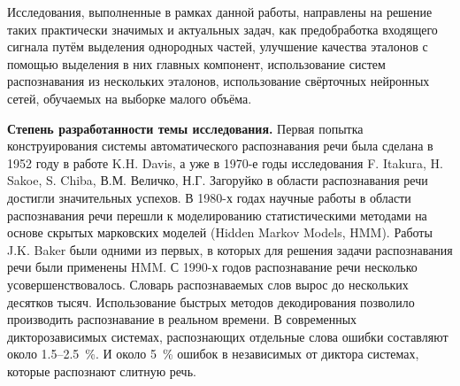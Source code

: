 Исследования, выполненные в рамках данной работы, направлены на решение таких практически значимых и актуальных задач, как предобработка входящего сигнала путём выделения однородных частей, улучшение качества эталонов с помощью выделения в них главных компонент, использование систем распознавания из нескольких эталонов, использование свёрточных нейронных сетей, обучаемых на выборке малого объёма.

\textbf{Степень разработанности темы исследования.}
Первая попытка конструирования системы автоматического распознавания речи была сделана в 1952 году в работе K.H. Davis, а уже в 1970-е годы исследования F. Itakura, H. Sakoe, S. Chiba, В.М. Величко, Н.Г. Загоруйко в области распознавания речи достигли значительных успехов.
В 1980-х годах научные работы в области распознавания речи перешли к моделированию статистическими методами на основе скрытых марковских моделей (Hidden Markov Models, HMM).
Работы J.K. Baker были одними из первых, в которых для решения задачи распознавания речи были применены HMM.
С 1990-х годов распознавание речи несколько усовершенствовалось.
Словарь распознаваемых слов вырос до нескольких десятков тысяч.
Использование быстрых методов декодирования позволило производить распознавание в реальном времени.
В современных дикторозависимых системах, распознающих отдельные слова ошибки составляют около 1.5--2.5~\%.
И около 5~\% ошибок в независимых от диктора системах, которые распознают слитную речь.

